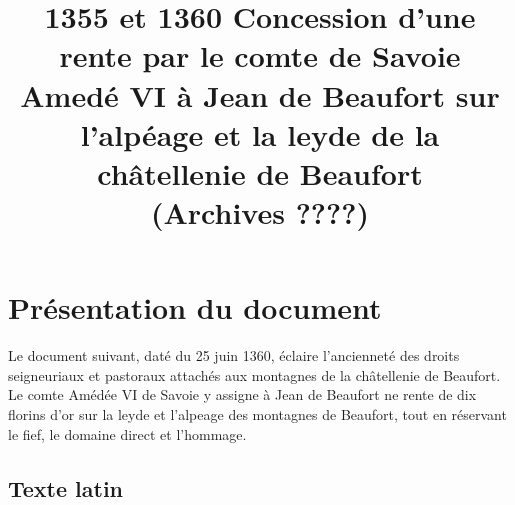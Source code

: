 \documentclass[a4paper,twoside,openany]{article}
\title{1355 et 1360 Concession d’une rente par le comte de Savoie Amedé VI à Jean de Beaufort sur l’alpéage et la leyde de la châtellenie de Beaufort
	\\(Archives ????)}
\begin{document}
\maketitle

\section{Présentation du document}

Le document suivant, daté du 25 juin 1360,  éclaire l'ancienneté des droits seigneuriaux et pastoraux attachés aux montagnes de la châtellenie de Beaufort. Le comte Amédée VI de Savoie y assigne à Jean de Beaufort ne rente de dix florins d'or sur la leyde et l'alpeage des montagnes de Beaufort, tout en réservant le fief, le domaine direct et l'hommage.

\subsection{Texte latin}
\end{document}
